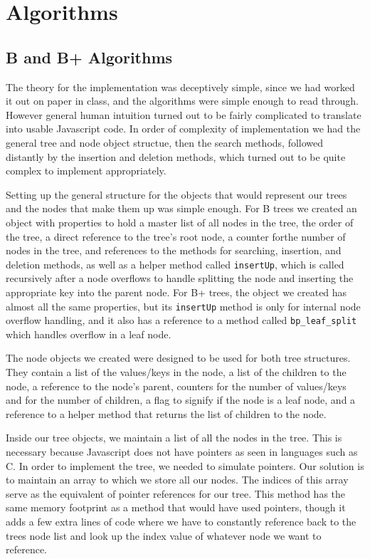 \section{Algorithms}

\subsection{B and B+ Algorithms}
The theory for the implementation was deceptively simple, since we had
worked it out on paper in class, and the algorithms were simple enough
to read through.  However general human intuition turned out to be
fairly complicated to translate into usable Javascript code.  In order
of complexity of implementation we had the general tree and node
object structue, then the search methods, followed distantly by the
insertion and deletion methods, which turned out to be quite complex
to implement appropriately.

Setting up the general structure for the objects that would represent
our trees and the nodes that make them up was simple enough.  For B
trees we created an object with properties to hold a master list of
all nodes in the tree, the order of the tree, a direct reference to
the tree's root node, a counter forthe number of nodes in the tree,
and references to the methods for searching, insertion, and deletion
methods, as well as a helper method called \texttt{insertUp}, which is
called recursively after a node overflows to handle splitting the node
and inserting the appropriate key into the parent node.  For B+ trees,
the object we created has almost all the same properties, but its
\texttt{insertUp} method is only for internal node overflow handling,
and it also has a reference to a method called
\texttt{bp\_leaf\_split} which handles overflow in a leaf node.

The node objects we created were designed to be used for both tree
structures.  They contain a list of the values/keys in the node, a
list of the children to the node, a reference to the node's parent,
counters for the number of values/keys and for the number of children,
a flag to signify if the node is a leaf node, and a reference to a
helper method that returns the list of children to the node.

Inside our tree objects, we maintain a list of all the nodes in the
tree. This is necessary because Javascript does not have pointers as
seen in languages such as C. In order to implement the tree, we needed
to simulate pointers. Our solution is to maintain an array to which we
store all our nodes. The indices of this array serve as the equivalent
of pointer references for our tree. This method has the same memory
footprint as a method that would have used pointers, though it adds a
few extra lines of code where we have to constantly reference back to
the trees node list and look up the index value of whatever node we
want to reference.

